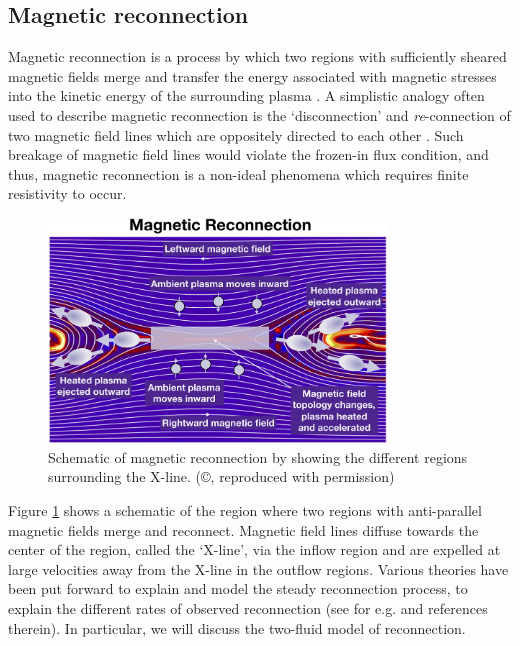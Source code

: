 \subsection{Magnetic reconnection}
Magnetic reconnection is a process by which two regions with sufficiently sheared magnetic fields merge and transfer the energy associated with magnetic stresses into the kinetic energy of the surrounding plasma \cite{Priest2000MagneticReconnection,Yamada2010MagneticReconnection}. A simplistic analogy often used to describe magnetic reconnection is the `disconnection' and \emph{re}-connection of two magnetic field lines which are oppositely directed to each other \cite{Gonzalez2016FundamentalReconnection}. Such breakage of magnetic field lines would violate the frozen-in flux condition, and thus, magnetic reconnection is a non-ideal phenomena which requires finite resistivity to occur. 

\begin{figure}
    \centering
    \includegraphics[width=0.8\textwidth]{images1/magnetic-reconnection-cartoon.png}
    \caption{Schematic of magnetic reconnection by \protect{} showing the different regions surrounding the X-line. (\copyright \protect{}, reproduced with permission)}
    \label{fig:chp1-reconnection-cartoon}
\end{figure}

Figure \ref{fig:chp1-reconnection-cartoon} shows a schematic of the region where two regions with anti-parallel magnetic fields merge and reconnect. Magnetic field lines diffuse towards the center of the region, called the `X-line', via the inflow region and are expelled at large velocities away from the X-line in the outflow regions. Various theories have been put forward to explain and model the steady reconnection process, to explain the different rates of observed reconnection (see for e.g.  and references therein). In particular, we will discuss the two-fluid model of reconnection. 

